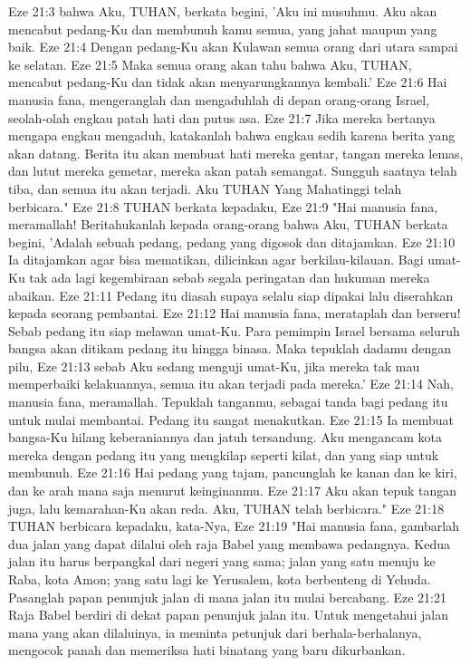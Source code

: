 Eze 21:3  bahwa Aku, TUHAN, berkata begini, 'Aku ini musuhmu. Aku akan mencabut pedang-Ku dan membunuh kamu semua, yang jahat maupun yang baik.
Eze 21:4  Dengan pedang-Ku akan Kulawan semua orang dari utara sampai ke selatan.
Eze 21:5  Maka semua orang akan tahu bahwa Aku, TUHAN, mencabut pedang-Ku dan tidak akan menyarungkannya kembali.'
Eze 21:6  Hai manusia fana, mengeranglah dan mengaduhlah di depan orang-orang Israel, seolah-olah engkau patah hati dan putus asa.
Eze 21:7  Jika mereka bertanya mengapa engkau mengaduh, katakanlah bahwa engkau sedih karena berita yang akan datang. Berita itu akan membuat hati mereka gentar, tangan mereka lemas, dan lutut mereka gemetar, mereka akan patah semangat. Sungguh saatnya telah tiba, dan semua itu akan terjadi. Aku TUHAN Yang Mahatinggi telah berbicara."
Eze 21:8  TUHAN berkata kepadaku,
Eze 21:9  "Hai manusia fana, meramallah! Beritahukanlah kepada orang-orang bahwa Aku, TUHAN berkata begini, 'Adalah sebuah pedang, pedang yang digosok dan ditajamkan.
Eze 21:10  Ia ditajamkan agar bisa mematikan, dilicinkan agar berkilau-kilauan. Bagi umat-Ku tak ada lagi kegembiraan sebab segala peringatan dan hukuman mereka abaikan.
Eze 21:11  Pedang itu diasah supaya selalu siap dipakai lalu diserahkan kepada seorang pembantai.
Eze 21:12  Hai manusia fana, merataplah dan berseru! Sebab pedang itu siap melawan umat-Ku. Para pemimpin Israel bersama seluruh bangsa akan ditikam pedang itu hingga binasa. Maka tepuklah dadamu dengan pilu,
Eze 21:13  sebab Aku sedang menguji umat-Ku, jika mereka tak mau memperbaiki kelakuannya, semua itu akan terjadi pada mereka.'
Eze 21:14  Nah, manusia fana, meramallah. Tepuklah tanganmu, sebagai tanda bagi pedang itu untuk mulai membantai. Pedang itu sangat menakutkan.
Eze 21:15  Ia membuat bangsa-Ku hilang keberaniannya dan jatuh tersandung. Aku mengancam kota mereka dengan pedang itu yang mengkilap seperti kilat, dan yang siap untuk membunuh.
Eze 21:16  Hai pedang yang tajam, pancunglah ke kanan dan ke kiri, dan ke arah mana saja menurut keinginanmu.
Eze 21:17  Aku akan tepuk tangan juga, lalu kemarahan-Ku akan reda. Aku, TUHAN telah berbicara."
Eze 21:18  TUHAN berbicara kepadaku, kata-Nya,
Eze 21:19  "Hai manusia fana, gambarlah dua jalan yang dapat dilalui oleh raja Babel yang membawa pedangnya. Kedua jalan itu harus berpangkal dari negeri yang sama; jalan yang satu menuju ke Raba, kota Amon; yang satu lagi ke Yerusalem, kota berbenteng di Yehuda. Pasanglah papan penunjuk jalan di mana jalan itu mulai bercabang.
Eze 21:21  Raja Babel berdiri di dekat papan penunjuk jalan itu. Untuk mengetahui jalan mana yang akan dilaluinya, ia meminta petunjuk dari berhala-berhalanya, mengocok panah dan memeriksa hati binatang yang baru dikurbankan.
